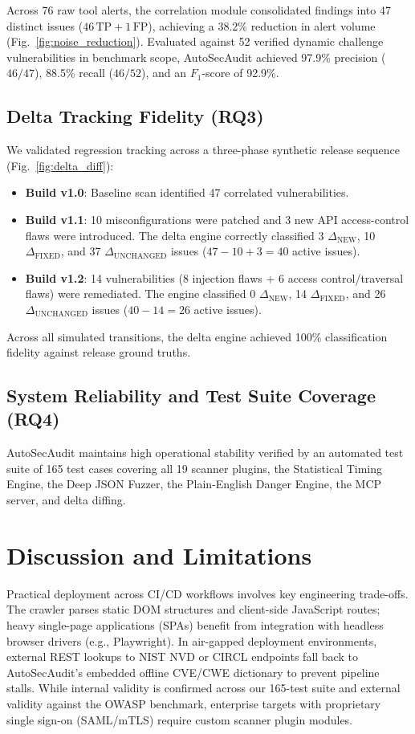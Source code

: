 \documentclass[conference]{IEEEtran}
\begin{document}
Across 76 raw tool alerts, the correlation module consolidated findings into 47 distinct issues ($46\,\text{TP} + 1\,\text{FP}$), achieving a 38.2\% reduction in alert volume (Fig.~\ref{fig:noise_reduction}). Evaluated against 52 verified dynamic challenge vulnerabilities in benchmark scope, AutoSecAudit achieved 97.9\% precision ($46/47$), 88.5\% recall ($46/52$), and an $F_1$-score of 92.9\%.

\subsection{Delta Tracking Fidelity (RQ3)}
We validated regression tracking across a three-phase synthetic release sequence (Fig.~\ref{fig:delta_diff}):
\begin{itemize}
    \item \textbf{Build v1.0}: Baseline scan identified 47 correlated vulnerabilities.
    \item \textbf{Build v1.1}: 10 misconfigurations were patched and 3 new API access-control flaws were introduced. The delta engine correctly classified 3 $\Delta_{\text{NEW}}$, 10 $\Delta_{\text{FIXED}}$, and 37 $\Delta_{\text{UNCHANGED}}$ issues ($47 - 10 + 3 = 40$ active issues).
    \item \textbf{Build v1.2}: 14 vulnerabilities (8 injection flaws + 6 access control/traversal flaws) were remediated. The engine classified 0 $\Delta_{\text{NEW}}$, 14 $\Delta_{\text{FIXED}}$, and 26 $\Delta_{\text{UNCHANGED}}$ issues ($40 - 14 = 26$ active issues).
\end{itemize}
Across all simulated transitions, the delta engine achieved 100\% classification fidelity against release ground truths.

\subsection{System Reliability and Test Suite Coverage (RQ4)}
AutoSecAudit maintains high operational stability verified by an automated test suite of 165 test cases covering all 19 scanner plugins, the Statistical Timing Engine, the Deep JSON Fuzzer, the Plain-English Danger Engine, the MCP server, and delta diffing.

\section{Discussion and Limitations}
Practical deployment across CI/CD workflows involves key engineering trade-offs. The crawler parses static DOM structures and client-side JavaScript routes; heavy single-page applications (SPAs) benefit from integration with headless browser drivers (e.g., Playwright). In air-gapped deployment environments, external REST lookups to NIST NVD or CIRCL endpoints fall back to AutoSecAudit's embedded offline CVE/CWE dictionary to prevent pipeline stalls. While internal validity is confirmed across our 165-test suite and external validity against the OWASP benchmark, enterprise targets with proprietary single sign-on (SAML/mTLS) require custom scanner plugin modules.
\end{document}
